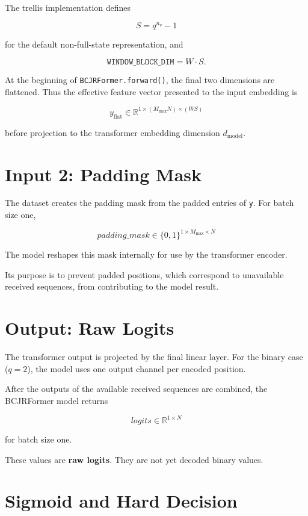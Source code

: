 \documentclass[11pt,a4paper]{article}
\begin{document}
The trellis implementation defines

\[
S = q^{n_v}-1
\]

for the default non-full-state representation, and

\[
\texttt{WINDOW\_BLOCK\_DIM}
    = W \cdot S.
\]

At the beginning of \texttt{BCJRFormer.forward()}, the final two dimensions are
flattened. Thus the effective feature vector presented to the input embedding is

\[
\boxed{
y_{\mathrm{flat}}
\in
\mathbb{R}^{1 \times (M_{\max}N) \times (WS)}
}
\]

before projection to the transformer embedding dimension $d_{\mathrm{model}}$.

\section{Input 2: Padding Mask}

The dataset creates the padding mask from the padded entries of \texttt{y}.
For batch size one,

\[
\boxed{
padding\_mask
\in
\{0,1\}^{1 \times M_{\max} \times N}
}
\]

The model reshapes this mask internally for use by the transformer encoder.

Its purpose is to prevent padded positions, which correspond to unavailable
received sequences, from contributing to the model result.

\section{Output: Raw Logits}

The transformer output is projected by the final linear layer. For the binary
case ($q=2$), the model uses one output channel per encoded position.

After the outputs of the available received sequences are combined, the
BCJRFormer model returns

\[
\boxed{
logits
\in
\mathbb{R}^{1 \times N}
}
\]

for batch size one.

These values are \textbf{raw logits}. They are not yet decoded binary values.

\section{Sigmoid and Hard Decision}
\end{document}
